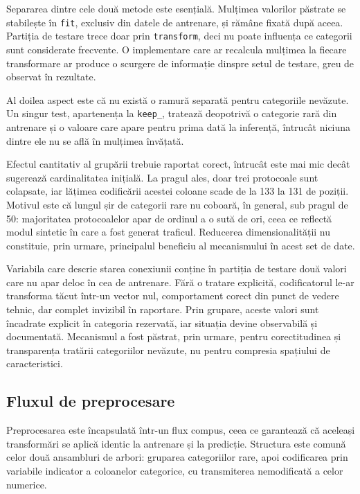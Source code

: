 Separarea dintre cele două metode este esențială. Mulțimea valorilor păstrate
se stabilește în \texttt{fit}, exclusiv din datele de antrenare, și rămâne
fixată după aceea. Partiția de testare trece doar prin \texttt{transform}, deci
nu poate influența ce categorii sunt considerate frecvente. O implementare care
ar recalcula mulțimea la fiecare transformare ar produce o scurgere de
informație dinspre setul de testare, greu de observat în rezultate.

Al doilea aspect este că nu există o ramură separată pentru categoriile
nevăzute. Un singur test, apartenența la \texttt{keep\_}, tratează deopotrivă o
categorie rară din antrenare și o valoare care apare pentru prima dată la
inferență, întrucât niciuna dintre ele nu se află în mulțimea învățată.

Efectul cantitativ al grupării trebuie raportat corect, întrucât este mai mic decât sugerează cardinalitatea inițială. La pragul ales, doar trei protocoale sunt colapsate, iar lățimea codificării acestei coloane scade de la 133 la 131 de poziții. Motivul este că lungul șir de categorii rare nu coboară, în general, sub pragul de 50: majoritatea protocoalelor apar de ordinul a o sută de ori, ceea ce reflectă modul sintetic în care a fost generat traficul. Reducerea dimensionalității nu constituie, prin urmare, principalul beneficiu al mecanismului în acest set de date.

Variabila care descrie starea conexiunii conține în partiția de testare două valori care nu apar deloc în cea de antrenare. Fără o tratare explicită, codificatorul le-ar transforma tăcut într-un vector nul, comportament corect din punct de vedere tehnic, dar complet invizibil în raportare. Prin grupare, aceste valori sunt încadrate explicit în categoria rezervată, iar situația devine observabilă și documentată. Mecanismul a fost păstrat, prin urmare, pentru corectitudinea și transparența tratării categoriilor nevăzute, nu pentru compresia spațiului de caracteristici.

\subsection{Fluxul de preprocesare}\label{subsec:preprocesare}

Preprocesarea este încapsulată într-un flux compus, ceea ce garantează că aceleași transformări se aplică identic la antrenare și la predicție. Structura este comună celor două ansambluri de arbori: gruparea categoriilor rare, apoi codificarea prin variabile indicator a coloanelor categorice, cu transmiterea nemodificată a celor numerice.

